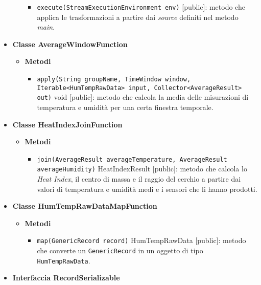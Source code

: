 \begin{itemize}
\begin{itemize}
\begin{itemize}
			            \item \texttt{execute(StreamExecutionEnvironment env)} [public]: metodo che applica le trasformazioni a partire dai \textit{source} definiti nel metodo \textit{main}.
		            \end{itemize}
	      \end{itemize}
	\item \textbf{Classe AverageWindowFunction}
	      \begin{itemize}
		      \item \textbf{Metodi}
		            \begin{itemize}
			            \item \texttt{apply(String groupName, TimeWindow window, Iterable<HumTempRawData> input, Collector<AverageResult> out)} void [public]: metodo che calcola la media delle misurazioni di temperatura e umidità per una certa finestra temporale.
		            \end{itemize}
	      \end{itemize}
	\item \textbf{Classe HeatIndexJoinFunction}
	      \begin{itemize}
		      \item \textbf{Metodi}
		            \begin{itemize}
			            \item \texttt{join(AverageResult averageTemperature, AverageResult averageHumidity)} HeatIndexResult [public]: metodo che calcola lo \textit{Heat Index}, il centro di massa e il raggio del cerchio a partire dai valori di temperatura e umidità medi e i sensori che li hanno prodotti.
		            \end{itemize}
	      \end{itemize}
	\item \textbf{Classe HumTempRawDataMapFunction}
	      \begin{itemize}
		      \item \textbf{Metodi}
		            \begin{itemize}
			            \item \texttt{map(GenericRecord record)} HumTempRawData [public]: metodo che converte un \texttt{GenericRecord} in un oggetto di tipo \texttt{HumTempRawData}.
		            \end{itemize}
	      \end{itemize}
	\item \textbf{Interfaccia RecordSerializable}\label{record_serializable}
	      \begin{itemize}

\end{itemize}
\end{itemize}
